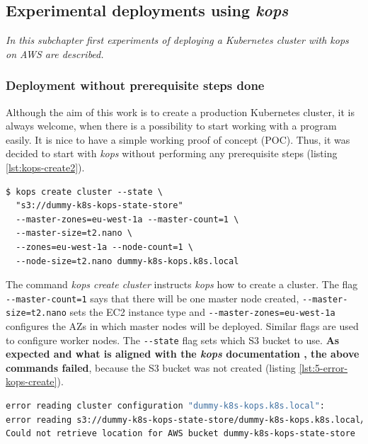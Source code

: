 \subsection{Experimental deployments using \textit{kops}}
\textit{In this subchapter first experiments of deploying a Kubernetes cluster with \textit{kops} on AWS are described.}

\subsubsection{Deployment without prerequisite steps done}

Although the aim of this work is to create a production Kubernetes cluster, it is always welcome, when there is a possibility to start working with a program easily. It is nice to have a simple working proof of concept (POC). Thus, it was decided to start with \textit{kops} without performing any prerequisite steps (listing \ref{lst:kops-create2}).
\begin{mdframed}[linecolor=white]
\begin{lstlisting}[basicstyle=\scriptsize,caption={Command used to create a cluster with \textit{kops}, without prerequisite steps performed},label=lst:kops-create2]
$ kops create cluster --state \
  "s3://dummy-k8s-kops-state-store"
  --master-zones=eu-west-1a --master-count=1 \
  --master-size=t2.nano \
  --zones=eu-west-1a --node-count=1 \
  --node-size=t2.nano dummy-k8s-kops.k8s.local
\end{lstlisting}
\end{mdframed}

The command \textit{kops create cluster} instructs \textit{kops} how to create a cluster. The flag \verb|--master-count=1| says that there will be one master node created, \verb|--master-size=t2.nano| sets the EC2 instance type and \verb|--master-zones=eu-west-1a| configures the AZs in which master nodes will be deployed. Similar flags are used to configure worker nodes. The \verb|--state| flag sets which S3 bucket to use.  \textbf{As expected and what is aligned with the \textit{kops} documentation \cite{online-kops-aws}, the above commands failed}, because the S3 bucket was not created (listing \ref{lst:5-error-kops-create}).
\begin{lstlisting}[basicstyle=\tiny,caption={Output of the commands used to create a cluster with \textit{kops}, without prerequisite steps performed},captionpos=b,language=Bash ,label=lst:5-error-kops-create]
error reading cluster configuration "dummy-k8s-kops.k8s.local":
error reading s3://dummy-k8s-kops-state-store/dummy-k8s-kops.k8s.local/config:
Could not retrieve location for AWS bucket dummy-k8s-kops-state-store
\end{lstlisting}

